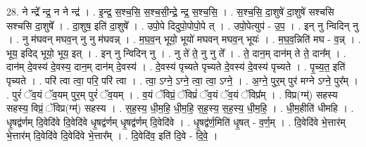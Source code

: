 \documentclass[17pt]{extarticle}
\begin{document}
28. ने न्द्रे᳚ न्द्र॒ न ने न्द्र॑ । . इ॒न्द्र॒ स॒श्च॒सि॒ स॒श्च॒सी॒न्द्रे॒ न्द्र॒ स॒श्च॒सि॒ । . स॒श्च॒सि॒ दा॒शुषे॑ दा॒शुषे॑ सश्चसि सश्चसि दा॒शुषे᳚ । . दा॒शुष॒ इति॑ दा॒शुषे᳚ । . उपो॒पे दिदुपो॒पोपो॒पे त् । . उपो॒पेत्युप॑ - उ॒प॒ । . इन् नु न्विदिन् नु । . नु म॑घवन् मघव॒न् नु नु म॑घवन्न् । . म॒घ॒व॒न् भूयो॒ भूयो॑ मघवन् मघव॒न् भूयः॑ । . म॒घ॒व॒न्निति॑ मघ - व॒न्न् । . भूय॒ इदिद् भूयो॒ भूय॒ इत् । . इन् नु न्विदिन् नु । . नु ते॑ ते॒ नु नु ते᳚ । . ते॒ दान॒म् दान॑म् ते ते॒ दान᳚म् । . दान॑म् दे॒वस्य॑ दे॒वस्य॒ दान॒म् दान॑म् दे॒वस्य॑ । . दे॒वस्य॑ पृच्यते पृच्यते दे॒वस्य॑ दे॒वस्य॑ पृच्यते । . पृ॒च्य॒त॒ इति॑ पृच्यते । . परि॑ त्वा त्वा॒ परि॒ परि॑ त्वा । . त्वा॒ ऽग्ने॒ ऽग्ने॒ त्वा॒ त्वा॒ ऽग्ने॒ । . अ॒ग्ने॒ पुर॒म् पुर॑ मग्ने ऽग्ने॒ पुर᳚म् । . पुरं॑ ॅव॒यं ॅव॒यम् पुर॒म् पुरं॑ ॅव॒यम् । . व॒यं ॅविप्रं॒ ॅविप्रं॑ ॅव॒यं ॅव॒यं ॅविप्र᳚म् । . विप्र(ग्म्॑) सहस्य सहस्य॒ विप्रं॒ ॅविप्र(ग्म्॑) सहस्य । . स॒ह॒स्य॒ धी॒म॒हि॒ धी॒म॒हि॒ स॒ह॒स्य॒ स॒ह॒स्य॒ धी॒म॒हि॒ । . धी॒म॒हीति॑ धीमहि । . धृ॒षद्व॑र्णम् दि॒वेदि॑वे दि॒वेदि॑वे धृ॒षद्व॑र्णम् धृ॒षद्व॑र्णम् दि॒वेदि॑वे । . धृ॒षद्व॑र्ण॒मिति॑ धृ॒षत् - व॒र्ण॒म् । . दि॒वेदि॑वे भे॒त्तार॑म् भे॒त्तार॑म् दि॒वेदि॑वे दि॒वेदि॑वे भे॒त्तार᳚म् । . दि॒वेदि॑व॒ इति॑ दि॒वे - दि॒वे॒ । \newline
\end{document}
